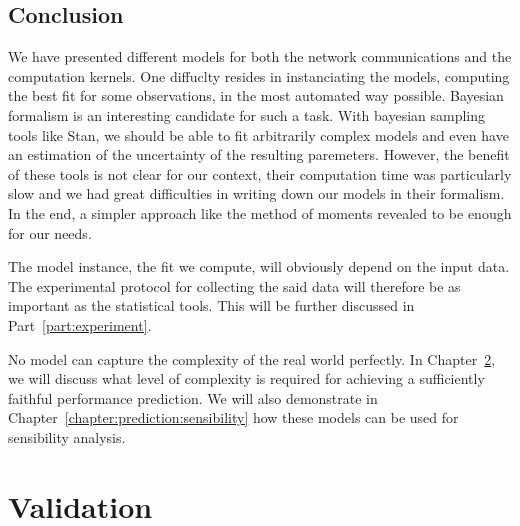     \section{Conclusion}%
        We have presented different models for both the network communications and the computation kernels. One
        diffuclty resides in instanciating the models, \ie computing the best fit for some observations, in the most
        automated way possible. Bayesian formalism is an interesting candidate for such a task. With bayesian sampling
        tools like Stan, we should be able to fit arbitrarily complex models and even have an estimation of the
        uncertainty of the resulting paremeters. However, the benefit of these tools is not clear for our context, their
        computation time was particularly slow and we had great difficulties in writing down our models in their
        formalism. In the end, a simpler approach like the method of moments revealed to be enough for our needs.

        The model instance, \ie the fit we compute, will obviously depend on the input data. The experimental protocol
        for collecting the said data will therefore be as important as the statistical tools. This will be further
        discussed in Part~\ref{part:experiment}.

        No model can capture the complexity of the real world perfectly. In Chapter~\ref{chapter:prediction:validation},
        we will discuss what level of complexity is required for achieving a sufficiently faithful performance
        prediction. We will also demonstrate in Chapter~\ref{chapter:prediction:sensibility} how these models can be
        used for sensibility analysis.

\chapter{Validation}%
\label{chapter:prediction:validation}

